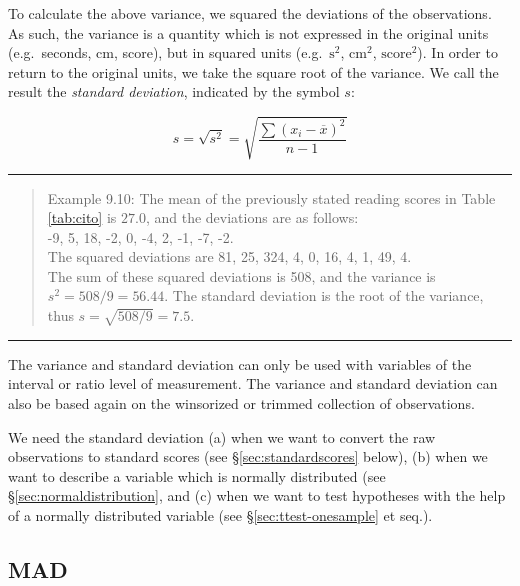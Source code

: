 \documentclass[
]{book}
\begin{document}
To calculate the above variance, we squared the deviations of the
observations. As such, the variance is a quantity which is not expressed
in the original units (e.g.~seconds, cm, score),
but in squared units (e.g.~\(\textrm{s}^2\),
\(\textrm{cm}^2\), \(\textrm{score}^2\)). In order to return to the
original units, we take the square root of the variance. We call the result the
\emph{standard deviation}, indicated by the symbol \(s\):

\begin{equation}
  s = \sqrt{s^2} = \sqrt{ \frac{ \sum (x_i - \overline{x})^2 } {n-1} }
  \label{eq:standarddeviation}
\end{equation}

\begin{center}\rule{0.5\linewidth}{0.5pt}\end{center}

\begin{quote}
Example 9.10:
The mean of the previously stated reading scores in
Table \ref{tab:cito} is
\(27.0\), and the deviations are as follows:\\
-9, 5, 18, -2, 0, -4, 2, -1, -7, -2.\\
The squared deviations are 81, 25, 324, 4, 0, 16, 4, 1, 49, 4.\\
The sum of these squared deviations is 508, and the variance is
\(s^2=508/9=56.44\). The standard deviation is the root of the
variance, thus \(s=\sqrt{508/9}=7.5\).
\end{quote}

\begin{center}\rule{0.5\linewidth}{0.5pt}\end{center}

The variance and standard deviation can only be used with variables
of the interval or ratio level of measurement. The variance and
standard deviation can also be based again on the winsorized or trimmed
collection of observations.

We need the standard deviation
(a) when we want to convert the raw
observations to standard scores (see §\ref{sec:standardscores} below),
(b) when we want to describe a variable
which is normally distributed (see §\ref{sec:normaldistribution}, and
(c) when we want to test hypotheses with the help of a normally distributed variable (see
§\ref{sec:ttest-onesample} et seq.).

\hypertarget{mad}{%
\subsection{MAD}\label{mad}}
\end{document}
